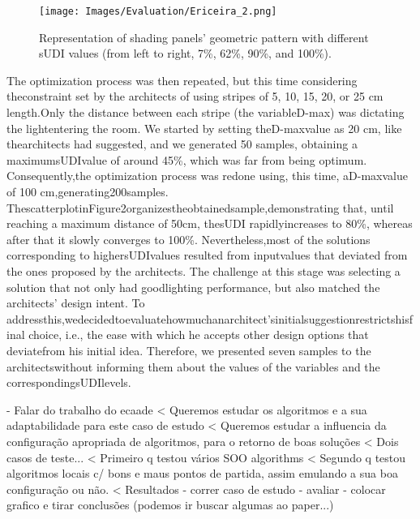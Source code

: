 \begin{figure}
	\centering
	\texttt{[image: Images/Evaluation/Ericeira\_2.png]}
	\caption{Representation of shading panels’ geometric pattern with different sUDI values (from left to right, 7\%, 62\%, 90\%, and 100\%).}
	\label{fig:ericeira_multiple_panels}
\end{figure}


The optimization process was then repeated, but this time considering theconstraint set by the architects of using stripes of 5, 10, 15, 20, or 25 cm length.Only the distance between each stripe (the variableD-max) was dictating the lightentering the room. We started by setting theD-maxvalue as 20 cm, like thearchitects had suggested, and we generated 50 samples, obtaining a maximumsUDIvalue of around 45\%, which was far from being optimum. Consequently,the optimization process was redone using, this time, aD-maxvalue of 100 cm,generating200samples. ThescatterplotinFigure2organizestheobtainedsample,demonstrating that, until reaching a maximum distance of 50cm, thesUDI rapidlyincreases to 80\%, whereas after that it slowly converges to 100\%. Nevertheless,most of the solutions corresponding to highersUDIvalues resulted from inputvalues that deviated from the ones proposed by the architects. 
The challenge at this stage was selecting a solution that not only had goodlighting performance, but also matched the architects’ design intent. To addressthis,wedecidedtoevaluatehowmuchanarchitect’sinitialsuggestionrestrictshisfinal choice, i.e., the ease with which he accepts other design options that deviatefrom his initial idea. Therefore, we presented seven samples to the architectswithout informing them about the values of the variables and the correspondingsUDIlevels. 


- Falar do trabalho do ecaade
< Queremos estudar os algoritmos e a sua adaptabilidade para este caso de estudo
< Queremos estudar a influencia da configuração apropriada de algoritmos, para o retorno de boas soluções
< Dois casos de teste...
< Primeiro q testou vários \ac{SOO} algorithms
< Segundo q testou algoritmos locais c/ bons e maus pontos de partida, assim emulando a sua boa configuração ou não. 
< Resultados
- correr caso de estudo 
- avaliar 
- colocar grafico e tirar conclusões (podemos ir buscar algumas ao paper...)

